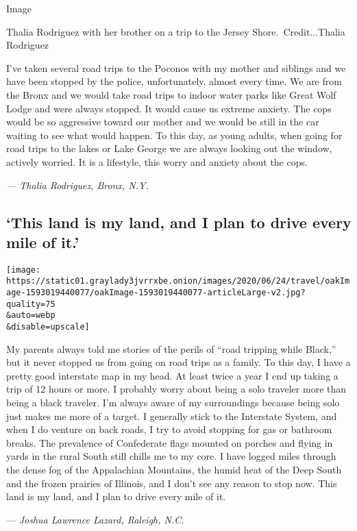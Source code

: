 Image

Thalia Rodriguez with her brother on a trip to the Jersey
Shore.~Credit...Thalia Rodriguez

I've taken several road trips to the Poconos with my mother and siblings
and we have been stopped by the police, unfortunately, almost every
time. We are from the Bronx and we would take road trips to indoor water
parks like Great Wolf Lodge and were always stopped. It would cause us
extreme anxiety. The cops would be so aggressive toward our mother and
we would be still in the car waiting to see what would happen. To this
day, as young adults, when going for road trips to the lakes or Lake
George we are always looking out the window, actively worried. It is a
lifestyle, this worry and anxiety about the cops.

\emph{--- Thalia Rodriguez, Bronx, N.Y.}

\hypertarget{this-land-is-my-land-and-i-plan-to-drive-every-mile-of-it}{%
\subsection{`This land is my land, and I plan to drive every mile of
it.'}\label{this-land-is-my-land-and-i-plan-to-drive-every-mile-of-it}}

\texttt{[image: https://static01.graylady3jvrrxbe.onion/images/2020/06/24/travel/oakImage-1593019440077/oakImage-1593019440077-articleLarge-v2.jpg?quality=75\\\&auto=webp\\\&disable=upscale]}

My parents always told me stories of the perils of ``road tripping while
Black,'' but it never stopped us from going on road trips as a family.
To this day, I have a pretty good interstate map in my head. At least
twice a year I end up taking a trip of 12 hours or more. I probably
worry about being a solo traveler more than being a black traveler. I'm
always aware of my surroundings because being solo just makes me more of
a target. I generally stick to the Interstate System, and when I do
venture on back roads, I try to avoid stopping for gas or bathroom
breaks. The prevalence of Confederate flags mounted on porches and
flying in yards in the rural South still chills me to my core. I have
logged miles through the dense fog of the Appalachian Mountains, the
humid heat of the Deep South and the frozen prairies of Illinois, and I
don't see any reason to stop now. This land is my land, and I plan to
drive every mile of it.

--- \emph{Joshua Lawrence Lazard, Raleigh, N.C.}

